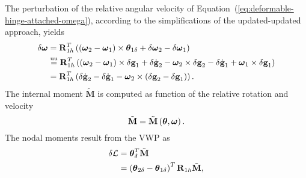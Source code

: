 \documentclass[10pt,dvips,fleqn,subeqn]{report}
\newcommand{\T}[1]{\bm{\mathbf{#1}}}
\newcommand{\TT}[1]{\bm{\mathbf{#1}}}
\newcommand{\equu}{\overset{\text{uu}}{=}}
\begin{document}
\begin{comment}
The relative angular velocity stems from the time derivative
of $\TT{R}_{1h}^T\TT{R}_{2h}$
\begin{equation}
	\T{\omega} = \T{R}_{1h}^T\plbr{\T{\omega}_2 - \T{\omega}_1} ;
	\label{eq:deformable-hinge-attached-omega}
\end{equation}
in fact, the time derivative of the relative orientation yields
\begin{align}
	\T{\omega} \times{}
	&= \frac{\mathrm{d}}{\mathrm{d}t}\plbr{\T{R}_{1h}^T \T{R}_{2h}}\plbr{\T{R}_{1h}^T \T{R}_{2h}}^T \nonumber \\
	&= \plbr{\dot{\T{R}}_{1h}^T \T{R}_{2h} + \T{R}_{1h}^T \dot{\T{R}}_{2h}} \T{R}_{2h}^T \T{R}_{1h} \nonumber \\
	&= \T{R}_{1h}^T \T{\omega}_1 \times{}^T \T{R}_{1h} + \T{R}_{1h}^T \T{\omega}_2 \times \T{R}_{1h} \nonumber \\
	&= \T{R}_{1h}^T \plbr{\T{\omega}_2 - \T{\omega}_1} \times \T{R}_{1h}
\end{align}
\end{comment}
The perturbation of the relative angular velocity
of Equation~(\ref{eq:deformable-hinge-attached-omega}),
according to the simplifications of the updated-updated approach, yields
\begin{align}
	\delta\T{\omega} &= \T{R}_{1h}^T\plbr{
		\plbr{\T{\omega}_2 - \T{\omega}_1} \times \T{\theta}_{1\delta}
		+ \delta\T{\omega}_2
		- \delta\T{\omega}_1
	} \nonumber \\
	&\equu \T{R}_{1h}^T\plbr{
		\plbr{\T{\omega}_2 - \T{\omega}_1} \times \delta\T{g}_1
		+ \delta\dot{\T{g}}_2 - \T{\omega}_2 \times \delta\T{g}_2
		- \delta\dot{\T{g}}_1 + \T{\omega}_1 \times \delta\T{g}_1
	} \nonumber \\
	&= \T{R}_{1h}^T\plbr{
		\delta\dot{\T{g}}_2
		- \delta\dot{\T{g}}_1
		- \T{\omega}_2 \times \plbr{\delta\T{g}_2 - \delta\T{g}_1}
	} .
\end{align}
The internal moment $\tilde{\T{M}}$ is computed as function
of the relative rotation and velocity
\begin{equation}
	\tilde{\T{M}} = \tilde{\T{M}}\plbr{\T{\theta}, \T{\omega}} .
\end{equation}
The nodal moments result from the VWP as
\begin{align}
	\delta\mathcal{L} &= \T{\theta}_{\delta}^T \tilde{\T{M}} \nonumber \\
	&= \plbr{
		\T{\theta}_{2\delta} - \T{\theta}_{1\delta}
	}^T \T{R}_{1h} \tilde{\T{M}} ,
\end{align}
\end{document}
